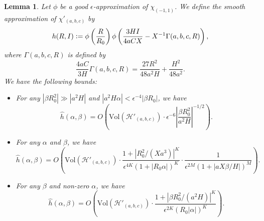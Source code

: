 \documentclass{article}
\def\H{{\mathcal H}}
\def\H{{\mathcal H}}
\newtheorem{lemma}[theorem]{Lemma}
\def\JR{\frac{27R^2}{48a^2H}+\frac{H^2}{48a^2}}
\begin{document}
\begin{lemma}\label{h-Fourier-Coeff}
Let $\phi$ be a good $\epsilon$-approximation of $\chi_{(-1,1)}$. We define the smooth approximation of $\chi'_{(a, b, c)}$ by
\begin{equation}\label{h-def}
h(R, I) \vcentcolon= \phi\left(\frac{R}{R_0}\right) \phi\left(\frac{3HI}{4aCX} - X^{-1}\Gamma(a,b,c,R)\right),
\end{equation}
where $\Gamma(a,b,c,R)$ is defined by 
\begin{equation*}
     \frac{4aC}{3H}\Gamma(a,b,c,R)  =\JR.
\end{equation*}
We have the following bounds:
\begin{itemize} 
  \item[\textnormal{(a)}]  For any $|\beta R_0^2| \gg |a^2H|$ and $|a^2 H \alpha| < \epsilon^{-4} |\beta R_0|$, we have
    \begin{equation*}
    \widehat{h}(\alpha, \beta) = O \left( \mathrm{Vol}\left(\H'_{(a, b, c)}\right) \cdot \epsilon^{-6} \left|\frac{\beta R_0^2}{a^2 H}\right|^{-1/2} \right).
    \end{equation*}
    
     \item[\textnormal{(b)}] For any $\alpha$ and $\beta$, we have
    \begin{equation*}
    \widehat{h}(\alpha, \beta) = O \left( \mathrm{Vol}\left(\H'_{(a, b, c)}\right) \cdot \frac{1 + |R_0^2 / (X a^3)|^K}{\epsilon^{4K} (1 + |R_0 \alpha|)^K} \cdot \frac{1}{\epsilon^{2M} (1 + |a X \beta / H|)^M} \right).
    \end{equation*}
    
    \item[\textnormal{(c)}] For any $\beta$ and non-zero $\alpha$, we have
    \begin{equation*}
    \widehat{h}(\alpha, \beta) = O \left( \mathrm{Vol}\left(\H'_{(a, b, c)}\right) \cdot \frac{1 + |\beta R_0^2 / (a^2 H)|^K}{\epsilon^{2K} (R_0 |\alpha|)^K} \right).
    \end{equation*}
\end{itemize}
\end{lemma}
\end{document}
